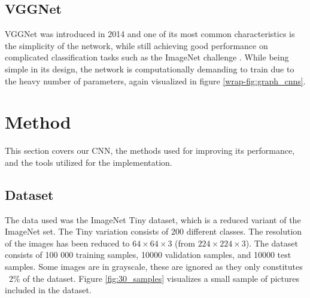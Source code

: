 \documentclass{kthreport}
\begin{document}
\subsection{VGGNet}
VGGNet was introduced in 2014 and one of its most common characteristics is the simplicity of the network, while still achieving good performance on complicated classification tasks such as the ImageNet challenge \cite{simonyan2014very}. While being simple in its design, the network is computationally demanding to train due to the heavy number of parameters, again visualized in figure \ref{wrap-fig:graph_cnns}.


\section{Method}
This section covers our CNN, the methods used for improving its performance, and the tools utilized for the implementation.

\subsection{Dataset}
The data used was the ImageNet Tiny dataset, which is a reduced variant of the ImageNet set. The Tiny variation consists of 200 different classes. The resolution of the images has been reduced to $64\times64\times3$ (from  $224\times224\times3$). The dataset consists of 100 000 training samples, 10000 validation samples, and 10000 test samples. Some images are in grayscale, these are ignored as they only constitutes ~2\% of the dataset.
Figure \ref{fig:30_samples} visualizes a small sample of pictures included in the dataset.

\end{document}
